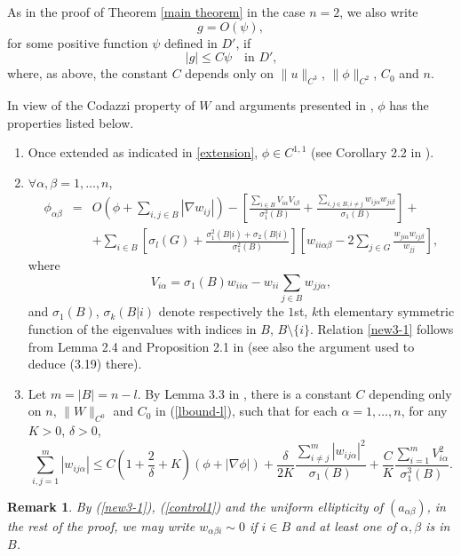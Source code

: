 \documentclass[12pt]{amsart}
\newtheorem{remark}[theorem]{Remark}
\newcommand{\1}{\mathbf 1}
\begin{document}
As in the proof of Theorem \ref{main theorem} in the case $n=2$, we also write 
$$
g=O(\psi),
$$
for some positive function $\psi$ defined in $D'$, if 
$$
|g|\le C\psi\quad\mbox{in $D'$,}
$$
where, as above, the constant $C$ depends only on $\|u\|_{C^3}$, $\|\phi\|_{C^2}$, $C_0$ and $n$.

\medskip

In view of the Codazzi property of $W$ and arguments presented in \cite{BG}, $\phi$ has the properties listed below.


\begin{enumerate}
\item[{I.}] Once extended as indicated in \eqref{extension}, $\phi\in C^{1,1}$ (see Corollary 2.2 in \cite{BG}).
\item[{II.}] $\forall \alpha,\beta=1,\dots,n$, 
\begin{eqnarray}\label{new3-1}
\phi_{\alpha\beta}&=&O\left(\phi +\sum_{i,j\in
B}|\nabla
w_{ij}|\right)-\left[\frac{\sum_{i\in
B}V_{i\alpha}V_{i\beta}}{\sigma^3_{1}(B)} +\frac{\sum_{i,j\in B,
i\neq j}
w_{ij\alpha}w_{ji\beta}}{\sigma_{1}(B)}\right]+\nonumber \\
&&+\sum_{i\in B}\left[\sigma_l(G)+\frac{\sigma_{1}^{2}(B|i)+
\sigma_{2}(B|i)}{\sigma_{1}^{2}(B)}\right]
\left[w_{ii\alpha\beta} - 2\sum_{j\in
G}\frac{w_{ji\alpha}w_{ij\beta}}{w_{jj}}\right],
\end{eqnarray}
where
\[
V_{i\alpha}=\sigma_{1}(B)w_{ii\alpha}-w_{ii}\sum_{j\in B}w_{jj\alpha},
\] 
and $\sigma_1(B)$, $\sigma_k(B|i)$ denote respectively the $1$st, $k$th elementary symmetric function of the eigenvalues with indices in $B$, $B\setminus\{i\}$. 
Relation \eqref{new3-1} follows from Lemma 2.4 and Proposition 2.1 in \cite{BG} (see also the argument used to deduce (3.19) there). 
\item[{III.}] Let $m=|B|=n-l$. By Lemma 3.3 in \cite{BG}, there is a constant $C$ depending only on $n$, $\|W\|_{C^0}$ and $C_0$ in (\ref{lbound-l}), such that for each $\alpha=1,\dots,n$, for any $K>0$, $\delta>0$,
\begin{equation}\label{control1}
\sum_{i,j=1}^m|w_{ij\alpha}|\le C\left(1+\frac{2}{\delta}+K\right)
(\phi+|\nabla \phi|)+\frac{\delta}{2K}\frac{\sum_{i\neq j}^m|w_{ij\alpha}|^{2}}
{\sigma_{1}(B)}+
\frac{C}{K}\frac{\sum_{i=1}^mV_{i\alpha}^{2}}{\sigma_{1}^{3}(B)}.
\end{equation}
\end{enumerate}
\begin{remark}\label{newsim} By (\ref{new3-1}), (\ref{control1}) and the uniform ellipticity of $(a_{\alpha\beta})$, in the rest of the proof, we may write $w_{\alpha\beta i}\sim 0$ if $i\in B$ and at least one of $\alpha, \beta$ is in $B$. \end{remark} 
\end{document}
